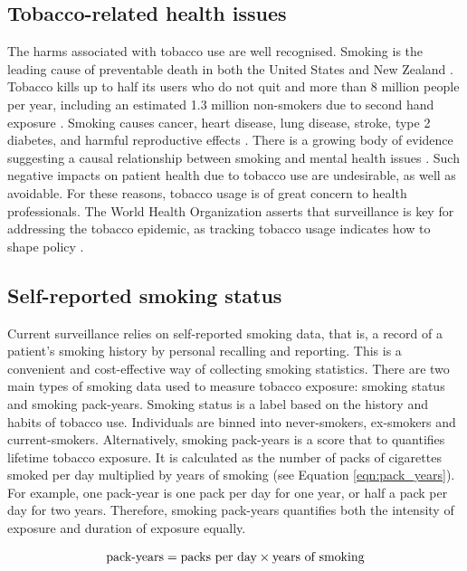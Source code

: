 \documentclass{article} %
\newcommand{\equationname}[1]{%
    \begingroup
        \leavevmode
        \addcontentsline{equ}{equations}{\protect\numberline{\theequation}#1}%
    \endgroup   
}
\begin{document}
\subsection{Tobacco-related health issues}
The harms associated with tobacco use are well recognised. Smoking is the leading cause of preventable death in both the United States \cite{hhs_smoking_2014} and New Zealand \cite{nip2024phcc_smoking2023}. Tobacco kills up to half its users who do not quit and more than 8 million people per year, including an estimated 1.3 million non-smokers due to second hand exposure \cite{who_tobacco}. Smoking causes cancer, heart disease, lung disease, stroke, type 2 diabetes, and harmful reproductive effects \cite{hhs_smoking_2014}. There is a growing body of evidence suggesting a causal relationship between smoking and mental health issues \cite{taylor2019smoking}. Such negative impacts on patient health due to tobacco use are undesirable, as well as avoidable. For these reasons, tobacco usage is of great concern to health professionals. The World Health Organization asserts that surveillance is key for addressing the tobacco epidemic, as tracking tobacco usage indicates how to shape policy \cite{who_tobacco}.

\subsection{Self-reported smoking status} \label{sec:srss}
Current surveillance relies on self-reported smoking data, that is, a record of a patient's smoking history by personal recalling and reporting. This is a convenient and cost-effective way of collecting smoking statistics. There are two main types of smoking data used to measure tobacco exposure: smoking status and smoking pack-years. Smoking status is a label based on the history and habits of tobacco use. Individuals are binned into never-smokers, ex-smokers and current-smokers. Alternatively, smoking pack-years is a score that to quantifies lifetime tobacco exposure. It is calculated as the number of packs of cigarettes smoked per day multiplied by years of smoking \cite{smokingpackyears} (see Equation \ref{eqn:pack_years}). For example, one pack-year is one pack per day for one year, or half a pack per day for two years. Therefore, smoking pack-years quantifies both the intensity of exposure and duration of exposure equally.

\begin{equation} \equationname{Smoking pack-years} \label{eqn:pack_years}
    \text{pack-years} = \text{packs per day} \times \text{years of smoking}
\end{equation}
\end{document}
